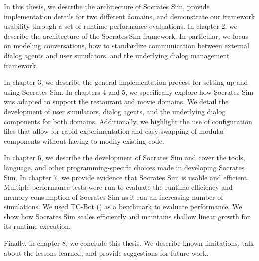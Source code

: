 In this thesis, we describe the architecture of Socrates Sim, provide implementation details for two different domains, and demonstrate our framework usability through a set of runtime performance evaluations. In chapter 2, we describe the architecture of the Socrates Sim framework. In particular, we focus on modeling conversations, how to standardize communication between external dialog agents and user simulators, and the underlying dialog management framework. 

In chapter 3, we describe the general implementation process for setting up and using Socrates Sim. In chapters 4 and 5, we specifically explore how Socrates Sim was adapted to support the restaurant and movie domains. We detail the development of user simulators, dialog agents, and the underlying dialog components for both domains. Additionally, we highlight the use of configuration files that allow for rapid experimentation and easy swapping of modular components without having to modify existing code. 

In chapter 6, we describe the development of Socrates Sim and cover the tools, language, and other programming-specific choices made in developing Socrates Sim. In chapter 7, we provide evidence that Socrates Sim is usable and efficient. Multiple performance tests were run to evaluate the runtime efficiency and memory consumption of Socrates Sim as it ran an increasing number of simulations. We used TC-Bot (\cite{li_end_to_end}) as a benchmark to evaluate performance. We show how Socrates Sim scales efficiently and maintains shallow linear growth for its runtime execution.

Finally, in chapter 8, we conclude this thesis. We describe known limitations, talk about the lessons learned, and provide suggestions for future work.

